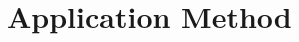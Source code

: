 \documentclass[../../master.tex]{subfiles}
\begin{document}
\section{Application Method}\label{sec:AppMethod}





\end{document}
